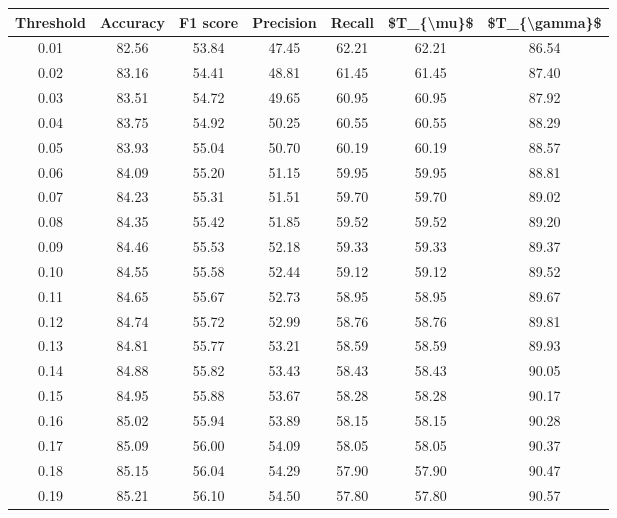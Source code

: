 \begin{tabular}{|c|c|c|c|c|c|c|}
\hline
 Threshold &  Accuracy &  F1 score &  Precision &  Recall &  \$T\_\{\textbackslash mu\}\$ &  \$T\_\{\textbackslash gamma\}\$ \\
\hline
      0.01 &     82.56 &     53.84 &      47.45 &   62.21 &      62.21 &         86.54 \\
      0.02 &     83.16 &     54.41 &      48.81 &   61.45 &      61.45 &         87.40 \\
      0.03 &     83.51 &     54.72 &      49.65 &   60.95 &      60.95 &         87.92 \\
      0.04 &     83.75 &     54.92 &      50.25 &   60.55 &      60.55 &         88.29 \\
      0.05 &     83.93 &     55.04 &      50.70 &   60.19 &      60.19 &         88.57 \\
      0.06 &     84.09 &     55.20 &      51.15 &   59.95 &      59.95 &         88.81 \\
      0.07 &     84.23 &     55.31 &      51.51 &   59.70 &      59.70 &         89.02 \\
      0.08 &     84.35 &     55.42 &      51.85 &   59.52 &      59.52 &         89.20 \\
      0.09 &     84.46 &     55.53 &      52.18 &   59.33 &      59.33 &         89.37 \\
      0.10 &     84.55 &     55.58 &      52.44 &   59.12 &      59.12 &         89.52 \\
      0.11 &     84.65 &     55.67 &      52.73 &   58.95 &      58.95 &         89.67 \\
      0.12 &     84.74 &     55.72 &      52.99 &   58.76 &      58.76 &         89.81 \\
      0.13 &     84.81 &     55.77 &      53.21 &   58.59 &      58.59 &         89.93 \\
      0.14 &     84.88 &     55.82 &      53.43 &   58.43 &      58.43 &         90.05 \\
      0.15 &     84.95 &     55.88 &      53.67 &   58.28 &      58.28 &         90.17 \\
      0.16 &     85.02 &     55.94 &      53.89 &   58.15 &      58.15 &         90.28 \\
      0.17 &     85.09 &     56.00 &      54.09 &   58.05 &      58.05 &         90.37 \\
      0.18 &     85.15 &     56.04 &      54.29 &   57.90 &      57.90 &         90.47 \\
      0.19 &     85.21 &     56.10 &      54.50 &   57.80 &      57.80 &         90.57 \\

\end{tabular}
